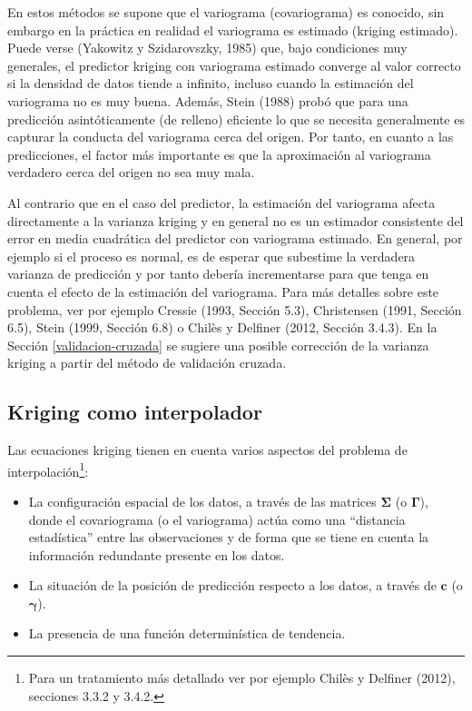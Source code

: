 \documentclass[
]{book}
\providecommand{\tightlist}{%
  \setlength{\itemsep}{0pt}\setlength{\parskip}{0pt}}
\theoremstyle{break}
\theoremstyle{definition}
\theoremstyle{definition}
\theoremstyle{definition}
\theoremstyle{definition}
\theoremstyle{remark}
\begin{document}
En estos métodos se supone que el variograma (covariograma) es conocido, sin embargo en la práctica en realidad el variograma es estimado (kriging estimado).
Puede verse (Yakowitz y Szidarovszky, 1985) que, bajo condiciones muy generales, el predictor kriging con variograma estimado converge al valor correcto si la densidad de datos tiende a infinito, incluso cuando la estimación del variograma no es muy buena.
Además, Stein (1988) probó que para una predicción asintóticamente (de relleno) eficiente lo que se necesita generalmente es capturar la conducta del variograma cerca del origen.
Por tanto, en cuanto a las predicciones, el factor más importante es que la aproximación al variograma
verdadero cerca del origen no sea muy mala.

Al contrario que en el caso del predictor, la estimación del
variograma afecta directamente a la varianza kriging y en general no es un estimador consistente del error en media cuadrática del predictor con variograma estimado.
En general, por ejemplo si el proceso es normal, es de esperar que subestime la verdadera varianza de predicción y por tanto debería incrementarse para que tenga en cuenta el efecto de la estimación del variograma.
Para más detalles sobre este problema, ver por ejemplo Cressie (1993, Sección 5.3), Christensen (1991, Sección 6.5), Stein (1999, Sección 6.8) o Chilès y Delfiner (2012, Sección 3.4.3).
En la Sección \ref{validacion-cruzada} se sugiere una posible corrección de la varianza kriging a partir del método de validación cruzada.

\subsection{Kriging como interpolador}\label{kriging-interpolador}

Las ecuaciones kriging tienen en cuenta varios aspectos del problema de interpolación\footnote{Para un tratamiento más detallado ver por ejemplo Chilès y Delfiner (2012), secciones 3.3.2 y 3.4.2.}:

\begin{itemize}
\tightlist
\item
  La configuración espacial de los datos, a través de las matrices \(\boldsymbol{\Sigma}\) (o \(\boldsymbol{\Gamma}\)), donde el covariograma (o el variograma) actúa como una ``distancia estadística'' entre las observaciones y de forma que se tiene en cuenta la información redundante presente en los datos.
\item
  La situación de la posición de predicción respecto a los datos, a través
  de \(\mathbf{c}\) (o \(\boldsymbol{\gamma}\)).
\item
  La presencia de una función determinística de tendencia.
\end{itemize}
\end{document}
